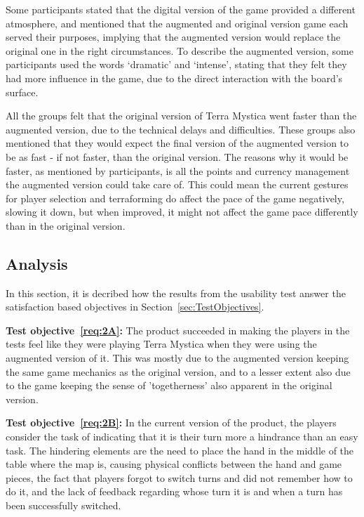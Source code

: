 Some participants stated that the digital version of the game provided a different atmosphere, and mentioned that the augmented and original version game each served their purposes, implying that the augmented version would replace the original one in the right circumstances. To describe the augmented version, some participants used the words ‘dramatic’ and ‘intense’, stating that they felt they had more influence in the game, due to the direct interaction with the board’s surface.

All the groups felt that the original version of Terra Mystica went faster than the augmented version, due to the technical delays and difficulties. These groups also mentioned that they would expect the final version of the augmented version to be as fast - if not faster, than the original version. The reasons why it would be faster, as mentioned by participants, is all the points and currency management the augmented version could take care of. This could mean the current gestures for player selection and terraforming do affect the pace of the game negatively, slowing it down, but when improved, it might not affect the game pace differently than in the original version.

\subsection{Analysis}
In this section, it is decribed how the results from the usability test answer the satisfaction based objectives in Section~\ref{sec:TestObjectives}.

\textbf{Test objective~\ref{req:2A}:} The product succeeded in making the players in the tests feel like they were playing Terra Mystica when they were using the augmented version of it. This was mostly due to the augmented version keeping the same game mechanics as the original version, and to a lesser extent also due to the game keeping the sense of 'togetherness' also apparent in the original version.

\textbf{Test objective~\ref{req:2B}:} In the current version of the product, the players consider the task of indicating that it is their turn more a hindrance than an easy task. The hindering elements are the need to place the hand in the middle of the table where the map is, causing physical conflicts between the hand and game pieces, the fact that players forgot to switch turns and did not remember how to do it, and the lack of feedback regarding whose turn it is and when a turn has been successfully switched. 

